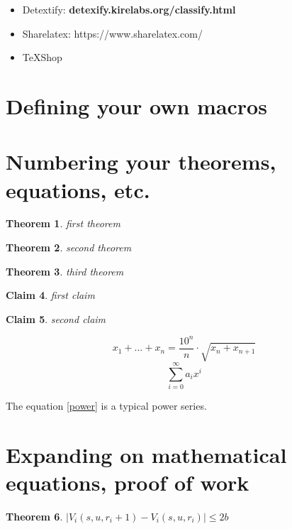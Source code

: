 \documentclass[11pt]{article}
\newtheorem{theorem}{Theorem}
\newtheorem{claim}[theorem]{Claim}
\begin{document}
	\begin{itemize}
		\item Detextify: \textbf{detexify.kirelabs.org/classify.html}
		\item Sharelatex: https://www.sharelatex.com/
		\item TeXShop
	\end{itemize}

\section*{Defining your own macros}

\section*{Numbering your theorems, equations, etc.}
	\begin{theorem} first theorem \end{theorem}
	\begin{theorem} second theorem \end{theorem}
	\begin{theorem} third theorem \end{theorem}
	\begin{claim} first claim \end{claim}
	\setcounter{theorem}{0}
	\begin{claim} second claim \end{claim}
	\begin{equation}
		\label{other} x_1 + \ldots + x_n = \dfrac{10^n}{n} \cdot \sqrt{x_{n} + x_{n+1}}
	\end{equation}
	\begin{equation}
		\label{power} \sum_{i=0}^{\infty} a_i x^i
	\end{equation}
	
	The equation \ref{power} is a typical power series.

\section*{Expanding on mathematical equations, proof of work}
\begin{theorem} $\mid V_i(s, u, r_i+1) - V_i(s, u, r_i) \mid \leq 2b$
\end{theorem}
\end{document}
